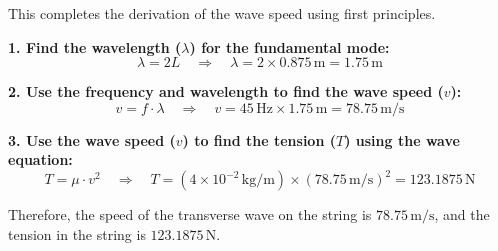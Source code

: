 \documentclass[journal,12pt,twocolumn]{IEEEtran}
\theoremstyle{remark}
\begin{document}
This completes the derivation of the wave speed using first principles.

\textbf{1. Find the wavelength (\(\lambda\)) for the fundamental mode:}
\begin{equation}\label{eq:wavelength}
    \lambda = 2L \quad \Rightarrow \quad \lambda = 2 \times 0.875 \, \text{m} = 1.75 \, \text{m}
\end{equation}

\textbf{2. Use the frequency and wavelength to find the wave speed (\(v\)):}
\begin{equation}\label{eq:wavespeed}
    v = f \cdot \lambda \quad \Rightarrow \quad v = 45 \, \text{Hz} \times 1.75 \, \text{m} = 78.75 \, \text{m/s}
\end{equation}


\textbf{3. Use the wave speed (\(v\)) to find the tension (\(T\)) using the wave equation:}
\begin{equation}\label{eq:tension}
    T = \mu \cdot v^2 \quad \Rightarrow \quad T = (4 \times 10^{-2} \, \text{kg/m}) \times (78.75 \, \text{m/s})^2 = 123.1875 \, \text{N}
\end{equation}

Therefore, the speed of the transverse wave on the string is $78.75 \, \text{m/s}$, and the tension in the string is $123.1875 \, \text{N}$.
\end{document}
